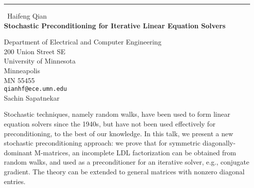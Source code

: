 \documentclass{report}
\begin{document}
\begin{center}
\rule{6in}{1pt} \
{\large Haifeng Qian \\
{\bf Stochastic Preconditioning for Iterative Linear Equation Solvers}}

Department of Electrical and Computer Engineering \\ 200 Union Street SE \\ University of Minnesota \\ Minneapolis \\ MN 55455
\\
{\tt qianhf@ece.umn.edu}\\
Sachin Sapatnekar\end{center}

Stochastic techniques, namely random walks, have been used to form
linear equation solvers since the 1940s, but have not been used
effectively for preconditioning, to the best of our knowledge.
In this talk, we present a new stochastic preconditioning approach:
we prove that for symmetric diagonally-dominant M-matrices, an
incomplete LDL factorization can be obtained from random walks, and used as a
preconditioner for an iterative solver, e.g., conjugate gradient. The theory can
be extended to general matrices with nonzero diagonal entries.
\end{document}
